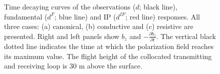 \documentclass[extra,mreferee]{gji}
\newcommand{\dip}{d^{IP}}
\begin{document}
\begin{figure}
  \caption{Time decaying curves of the observations  ($d$; black line), fundamental ($d^F$; blue line) and IP ($\dip$; red line) responses. All three cases: (a) canonical, (b) conductive and (c) resistive are presented. Right and left panels show $b_z$ and $-\frac{\partial b_z}{\partial t}$. The vertical black dotted line indicates the time at which the polarization field reaches its maximum value. The flight height of the collocated transmitting and receiving loop is 30 m above the surface.}
  \label{F:Three_IPresp}
\end{figure}
\end{document}
